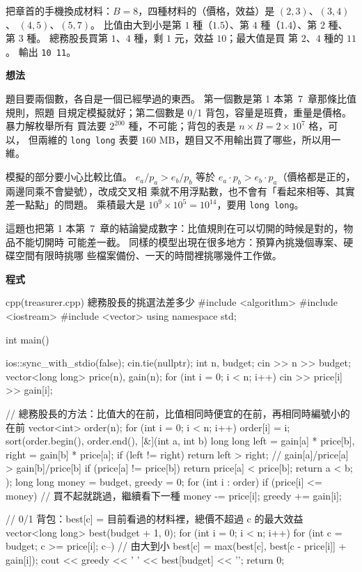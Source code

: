 把章首的手機換成材料：$B = 8$，四種材料的（價格，效益）是 $(2, 3)$、$(3, 4)$、
$(4, 5)$、$(5, 7)$。 比值由大到小是第 $1$ 種（$1.5$）、第 $4$ 種（$1.4$）、第
$2$ 種、第 $3$ 種。 總務股長買第 $1$、$4$ 種，剩 $1$ 元，效益 $10$；最大值是買
第 $2$、$4$ 種的 $11$。 輸出 \texttt{10 11}。

\textbf{想法}

題目要兩個數，各自是一個已經學過的東西。 第一個數是第 1 本第~7~章那條比值規則，照題
目規定模擬就好；第二個數是 0/1 背包，容量是班費，重量是價格。 暴力解枚舉所有
買法要 $2^{200}$ 種，不可能；背包的表是 $n \times B = 2 \times 10^7$ 格，可以，
但兩維的 \texttt{long long} 表要 $160$ MB，題目又不用輸出買了哪些，所以用一維。

模擬的部分要小心比較比值。 $e_a / p_a > e_b / p_b$ 等於
$e_a \cdot p_b > e_b \cdot p_a$（價格都是正的，兩邊同乘不會變號），改成交叉相
乘就不用浮點數，也不會有「看起來相等、其實差一點點」的問題。 乘積最大是
$10^9 \times 10^5 = 10^{14}$，要用 \texttt{long long}。

這題也把第 1 本第~7~章的結論變成數字：比值規則在可以切開的時候是對的，物品不能切開時
可能差一截。 同樣的模型出現在很多地方：預算內挑幾個專案、硬碟空間有限時挑哪
些檔案備份、一天的時間裡挑哪幾件工作做。

\textbf{程式}

\begin{example}[label=ex:treasurer]{cpp}{(treasurer.cpp) 總務股長的挑選法差多少}
#include <algorithm>
#include <iostream>
#include <vector>
using namespace std;

int main() {
    ios::sync_with_stdio(false);
    cin.tie(nullptr);
    int n, budget;
    cin >> n >> budget;
    vector<long long> price(n), gain(n);
    for (int i = 0; i < n; i++) {
        cin >> price[i] >> gain[i];
    }

    // 總務股長的方法：比值大的在前，比值相同時便宜的在前，再相同時編號小的在前
    vector<int> order(n);
    for (int i = 0; i < n; i++) {
        order[i] = i;
    }
    sort(order.begin(), order.end(), [&](int a, int b) {
        long long left = gain[a] * price[b], right = gain[b] * price[a];
        if (left != right) {
            return left > right;          // gain[a]/price[a] > gain[b]/price[b]
        }
        if (price[a] != price[b]) {
            return price[a] < price[b];
        }
        return a < b;
    });
    long long money = budget, greedy = 0;
    for (int i : order) {
        if (price[i] <= money) {          // 買不起就跳過，繼續看下一種
            money -= price[i];
            greedy += gain[i];
        }
    }

    // 0/1 背包：best[c] = 目前看過的材料裡，總價不超過 c 的最大效益
    vector<long long> best(budget + 1, 0);
    for (int i = 0; i < n; i++) {
        for (int c = budget; c >= price[i]; c--) {   // 由大到小
            best[c] = max(best[c], best[c - price[i]] + gain[i]);
        }
    }
    cout << greedy << ' ' << best[budget] << '\n';
    return 0;
}
\end{example}

